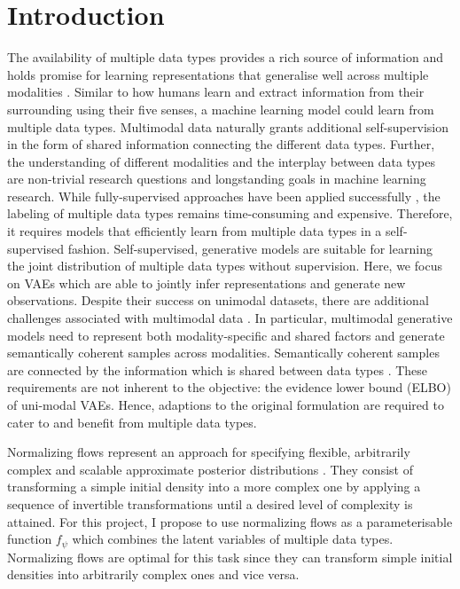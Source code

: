 \section{Introduction}

The availability of multiple data types provides a rich source of information and holds promise for learning representations that generalise well across multiple modalities \parencite{baltrusaitis_multimodal_2019}.
Similar to how humans learn and extract information from their surrounding using their five senses, a machine learning model could learn from multiple data types.
Multimodal data naturally grants additional self-supervision in the form of shared information connecting the different data types.
Further, the understanding of different modalities and the interplay between data types are non-trivial research questions and longstanding goals in machine learning research.
While fully-supervised approaches have been applied successfully \parencite{karpathy_deep_2015,tsai_learning_2018}, the labeling of multiple data types remains time-consuming and expensive.
Therefore, it requires models that efficiently learn from multiple data types in a self-supervised fashion.
Self-supervised, generative models are suitable for learning the joint distribution of multiple data types without supervision.
Here, we focus on VAEs \parencite{kingma_auto-encoding_2014,rezende_stochastic_2014} which are able to jointly infer representations and generate new observations.
Despite their success on unimodal datasets, there are additional challenges associated with multimodal data \parencite{suzuki_joint_2016, vedantam_generative_2018}.
In particular, multimodal generative models need to represent both modality-specific and shared factors and generate semantically coherent samples across modalities.
Semantically coherent samples are connected by the information which is shared between data types \parencite{shi_variational_2019}.
These requirements are not inherent to the objective: the evidence lower bound (ELBO) of uni-modal VAEs.
Hence, adaptions to the original formulation are required to cater to and benefit from multiple data types.


Normalizing flows represent an approach for specifying flexible, arbitrarily complex and scalable approximate posterior distributions \parencite{papamakarios_normalizing_2019,rezende_variational_2016}.
They consist of transforming a simple initial density into a more complex one by applying a sequence of invertible transformations until a desired level of complexity is attained.
For this project, I propose to use normalizing flows as a parameterisable function $f_\psi$ which combines the latent variables of multiple data types.
Normalizing flows are optimal for this task since they can transform simple initial densities into arbitrarily complex ones and vice versa.

